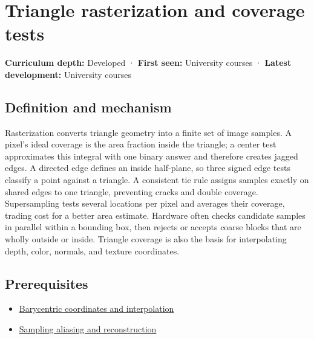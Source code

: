 \hypertarget{appendix-ed3f9bc298fe}{}\label{referencestart:appendix-ed3f9bc298fe}
\section{Triangle rasterization and coverage tests}\label{appendix-ed3f9bc298fe-triangle-rasterization-and-coverage-tests}

\hypertarget{appendix-ed3f9bc298fe-triangle-rasterization-and-coverage-tests}{}

\textbf{Curriculum depth:} Developed · \textbf{First seen:} University courses · \textbf{Latest development:} University courses

\begin{allmightroledefinition}

\subsection{Definition and mechanism}\label{appendix-ed3f9bc298fe-definition-and-mechanism}

\hypertarget{appendix-ed3f9bc298fe-definition-and-mechanism}{}

Rasterization converts triangle geometry into a finite set of image samples. A pixel's ideal coverage is the area fraction inside the triangle; a center test approximates this integral with one binary answer and therefore creates jagged edges. A directed edge defines an inside half-plane, so three signed edge tests classify a point against a triangle. A consistent tie rule assigns samples exactly on shared edges to one triangle, preventing cracks and double coverage. Supersampling tests several locations per pixel and averages their coverage, trading cost for a better area estimate. Hardware often checks candidate samples in parallel within a bounding box, then rejects or accepts coarse blocks that are wholly outside or inside. Triangle coverage is also the basis for interpolating depth, color, normals, and texture coordinates.

\end{allmightroledefinition}

\subsection{Prerequisites}\label{appendix-ed3f9bc298fe-prerequisites}

\hypertarget{appendix-ed3f9bc298fe-prerequisites}{}

\begin{itemize}
\tightlist
\item
  \hyperref[appendix-02b9d9a81dca]{Barycentric coordinates and interpolation}
\item
  \hyperref[appendix-6a7869dd79a6]{Sampling aliasing and reconstruction}
\end{itemize}

